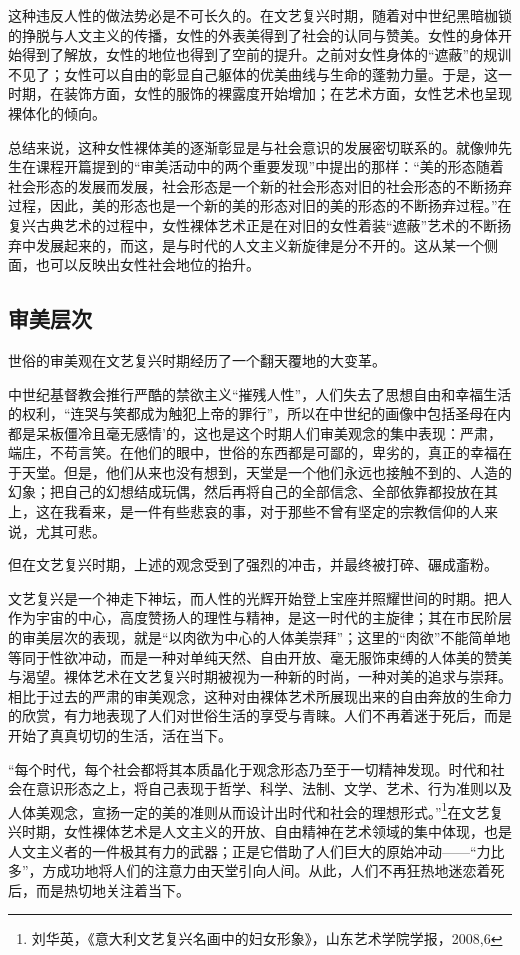 \documentclass[UTF8,a4paper]{ctexart}
\begin{document}
这种违反人性的做法势必是不可长久的。在文艺复兴时期，随着对中世纪黑暗枷锁的挣脱与人文主义的传播，女性的外表美得到了社会的认同与赞美。女性的身体开始得到了解放，女性的地位也得到了空前的提升。之前对女性身体的``遮蔽''的规训不见了；女性可以自由的彰显自己躯体的优美曲线与生命的蓬勃力量。于是，这一时期，在装饰方面，女性的服饰的裸露度开始增加；在艺术方面，女性艺术也呈现裸体化的倾向。

总结来说，这种女性裸体美的逐渐彰显是与社会意识的发展密切联系的。就像帅先生在课程开篇提到的``审美活动中的两个重要发现''中提出的那样：``美的形态随着社会形态的发展而发展，社会形态是一个新的社会形态对旧的社会形态的不断扬弃过程，因此，美的形态也是一个新的美的形态对旧的美的形态的不断扬弃过程。''在复兴古典艺术的过程中，女性裸体艺术正是在对旧的女性着装``遮蔽''艺术的不断扬弃中发展起来的，而这，是与时代的人文主义新旋律是分不开的。这从某一个侧面，也可以反映出女性社会地位的抬升。

\subsection{审美层次}

世俗的审美观在文艺复兴时期经历了一个翻天覆地的大变革。

中世纪基督教会推行严酷的禁欲主义``摧残人性''，人们失去了思想自由和幸福生活的权利，``连哭与笑都成为触犯上帝的罪行''，所以在中世纪的画像中包括圣母在内都是呆板僵冷且毫无感情'的，这也是这个时期人们审美观念的集中表现：严肃，端庄，不苟言笑。在他们的眼中，世俗的东西都是可鄙的，卑劣的，真正的幸福在于天堂。但是，他们从来也没有想到，天堂是一个他们永远也接触不到的、人造的幻象；把自己的幻想结成玩偶，然后再将自己的全部信念、全部依靠都投放在其上，这在我看来，是一件有些悲哀的事，对于那些不曾有坚定的宗教信仰的人来说，尤其可悲。

但在文艺复兴时期，上述的观念受到了强烈的冲击，并最终被打碎、碾成齑粉。

文艺复兴是一个神走下神坛，而人性的光辉开始登上宝座并照耀世间的时期。把人作为宇宙的中心，高度赞扬人的理性与精神，是这一时代的主旋律；其在市民阶层的审美层次的表现，就是``以肉欲为中心的人体美崇拜''；这里的``肉欲''不能简单地等同于性欲冲动，而是一种对单纯天然、自由开放、毫无服饰束缚的人体美的赞美与渴望。裸体艺术在文艺复兴时期被视为一种新的时尚，一种对美的追求与崇拜。相比于过去的严肃的审美观念，这种对由裸体艺术所展现出来的自由奔放的生命力的欣赏，有力地表现了人们对世俗生活的享受与青睐。人们不再着迷于死后，而是开始了真真切切的生活，活在当下。

``每个时代，每个社会都将其本质晶化于观念形态乃至于一切精神发现。时代和社会在意识形态之上，将自己表现于哲学、科学、法制、文学、艺术、行为准则以及人体美观念，宣扬一定的美的准则从而设计出时代和社会的理想形式。''\footnote{刘华英，《意大利文艺复兴名画中的妇女形象》，山东艺术学院学报，2008,6}在文艺复兴时期，女性裸体艺术是人文主义的开放、自由精神在艺术领域的集中体现，也是人文主义者的一件极其有力的武器；正是它借助了人们巨大的原始冲动——``力比多''，方成功地将人们的注意力由天堂引向人间。从此，人们不再狂热地迷恋着死后，而是热切地关注着当下。
\end{document}
